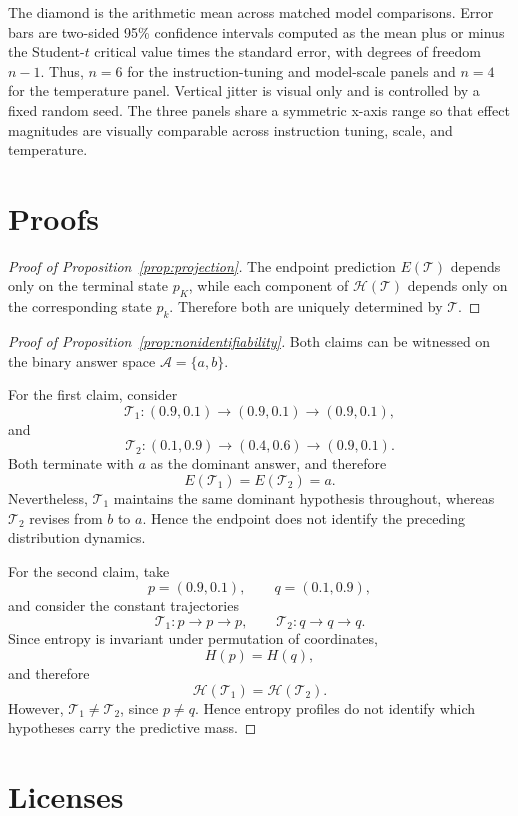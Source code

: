 \documentclass{article}
\begin{document}
The diamond is the arithmetic mean across matched model comparisons. Error bars are two-sided 95\% confidence intervals computed as the mean plus or minus the Student-$t$ critical value times the standard error, with degrees of freedom $n-1$. Thus, $n=6$ for the instruction-tuning and model-scale panels and $n=4$ for the temperature panel. Vertical jitter is visual only and is controlled by a fixed random seed. The three panels share a symmetric x-axis range so that effect magnitudes are visually comparable across instruction tuning, scale, and temperature.
\section{Proofs}
\label{app:proofs}

\begin{proof}[Proof of Proposition~\ref{prop:projection}]
The endpoint prediction \(E(\mathcal{T})\) depends only on the terminal state \(p_K\), while each component of \(\mathcal{H}(\mathcal{T})\) depends only on the corresponding state \(p_k\). Therefore both are uniquely determined by \(\mathcal{T}\).
\end{proof}


\begin{proof}[Proof of Proposition~\ref{prop:nonidentifiability}]
Both claims can be witnessed on the binary answer space \(\mathcal{A}=\{a,b\}\).

For the first claim, consider
\[
\mathcal{T}_1:
(0.9,0.1)
\rightarrow
(0.9,0.1)
\rightarrow
(0.9,0.1),
\]
and
\[
\mathcal{T}_2:
(0.1,0.9)
\rightarrow
(0.4,0.6)
\rightarrow
(0.9,0.1).
\]
Both terminate with \(a\) as the dominant answer, and therefore
\[
E(\mathcal{T}_1)=E(\mathcal{T}_2)=a.
\]
Nevertheless, \(\mathcal{T}_1\) maintains the same dominant hypothesis throughout, whereas \(\mathcal{T}_2\) revises from \(b\) to \(a\). Hence the endpoint does not identify the preceding distribution dynamics.

For the second claim, take
\[
p=(0.9,0.1),
\qquad
q=(0.1,0.9),
\]
and consider the constant trajectories
\[
\mathcal{T}_1 : p \to p \to p,
\qquad
\mathcal{T}_2 : q \to q \to q.
\]
Since entropy is invariant under permutation of coordinates,
\[
H(p)=H(q),
\]
and therefore
\[
\mathcal{H}(\mathcal{T}_1)
=
\mathcal{H}(\mathcal{T}_2).
\]
However, \(\mathcal{T}_1 \neq \mathcal{T}_2\), since \(p\neq q\). Hence entropy profiles do not identify which hypotheses carry the predictive mass.
\end{proof}

\section{Licenses}
\label{subsec:licenses}
\end{document}
